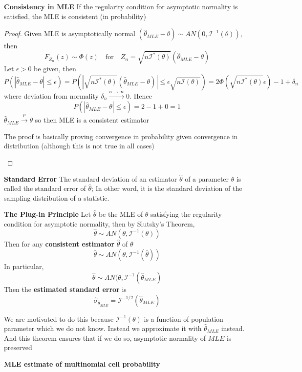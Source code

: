 \documentclass[11pt]{article}
\begin{document}
\begin{theorem*}
  \textbf{Consistency in MLE} If the regularity condition for asymptotic normality is satisfied, the MLE is consistent (in probability)
  \begin{proof}
    Given MLE is asymptotically normal $(\hat{\theta}_{MLE} - \theta) \sim AN(0, \mathcal{I}^{-1}(\theta)) $, then
    \[
      F_{Z_n}(z) \sim \Phi(z) \quad \text{for}\quad Z_n = \sqrt{n \mathcal{I}^*(\theta)}(\hat{\theta}_{MLE} - \theta)
    \]
    Let $\epsilon > 0$ be given, then
    \[
      P(| \hat{\theta}_{MLE} - \theta | \leq \epsilon) = P(|  \sqrt{n \mathcal{I}^*(\theta)}(\hat{\theta}_{MLE} - \theta)| \leq \epsilon \sqrt{n \mathcal{I}(\theta)}) = 2\Phi(\sqrt{n \mathcal{I}^*(\theta)}\epsilon) - 1 + \delta_n
    \]
    where deviation from normality $\delta_n \stackrel{n\to\infty}{\to} 0$. Hence
    \[
        P(| \hat{\theta}_{MLE} - \theta | \leq \epsilon) = 2 - 1 + 0 = 1
    \]
    $\hat{\theta}_{MLE}\stackrel{p}{\to} \theta$ so then MLE is a consistent estimator
    \begin{rem}
      The proof is basically proving convergence in probability given convergence in distribution (although this is not true in all cases)
    \end{rem}
  \end{proof}
\end{theorem*}

\begin{defn*}
  \textbf{Standard Error} The standard deviation of an estimator $\hat{\theta}$ of a parameter $\theta$ is called the standard error of $\hat{\theta}$; In other word, it is the standard deviation of the sampling distribution of a statistic.
\end{defn*}

\begin{theorem*}
  \textbf{The Plug-in Principle} Let $\hat{\theta}$ be the MLE of $\theta$ satisfying the regularity condition for asymptotic normality, then by Slutsky's Theorem,
  \[
    \hat{\theta} \sim AN(\theta, \mathcal{I}^{-1}(\theta))
  \]
  Then for any \textbf{consistent estimator} $\hat{\theta}$ of $\theta$
  \[
    \hat{\theta} \sim AN(\theta, \mathcal{I}^{-1}(\hat{\theta}))
  \]
  In particular,
  \[
    \hat{\theta} \sim AN(\theta, \mathcal{I}^{-1}(\hat{\theta}_{MLE})
  \]
  Then the \textbf{estimated standard error} is
  \[
    \hat{\sigma}_{\hat{\theta}_{MLE}} = \mathcal{I}^{-1/2}(\hat{\theta}_{MLE})
  \]
  \begin{rem}
    We are motivated to do this because $\mathcal{I}^{-1}(\theta)$ is a function of population parameter which we do not know. Instead we approximate it with $\hat{\theta}_{MLE}$ instead. And this theorem ensures that if we do so, asymptotic normality of $MLE$ is preserved
  \end{rem}
\end{theorem*}


\begin{defn*}
  \textbf{MLE estimate of multinomial cell probability}
\end{defn*}
\end{document}
